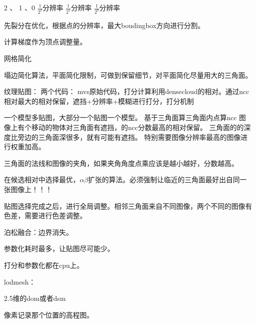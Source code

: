 2 、 1 、0
$\frac{1}{2^2}$分辨率
$\frac{1}{2^1}$分辨率
$\frac{1}{2^0}$分辨率

先裂分在优化，根据点的分辨率，最大boudingbox方向进行分割。

计算梯度作为顶点调整量。


网格简化

塌边简化算法，平面简化限制，可做到保留细节，对平面简化尽量用大的三角面。


纹理贴图：
两个代码：
mvs原始代码，打分计算利用densecloud的相对。通过ncc相对最大的相对保留，遮挡+分辨率+模糊进行打分，打分机制

一个模型多贴图，大部分一个贴图一个模型。
基于三角面算三角面内点算ncc
图像上有个移动的物体对三角面有遮挡，的ncc分数最高的相对保留。
三角面的的深度比旁边的三角面深很多，就有可能有遮挡。
特别需要图像分辨率最高的图像进行权重加高。

三角面的法线和图像的夹角，如果夹角角度点乘应该是越小越好，分数越高。

在候选相对中选择最优，$\alpha \beta$扩张的算法。必须强制让临近的三角面最好出自同一张图像上！！！ 

贴图选择完成之后，进行全局调整。相邻三角面来自不同图像，两个不同的图像有色差，需要进行色差调整。

泊松融合：边界消失。

参数化耗时最多，让贴图尽可能少。

打分和参数化都在cpu上。

lodmesh：


2.5维的dom或者dsm


像素记录那个位置的高程图。
